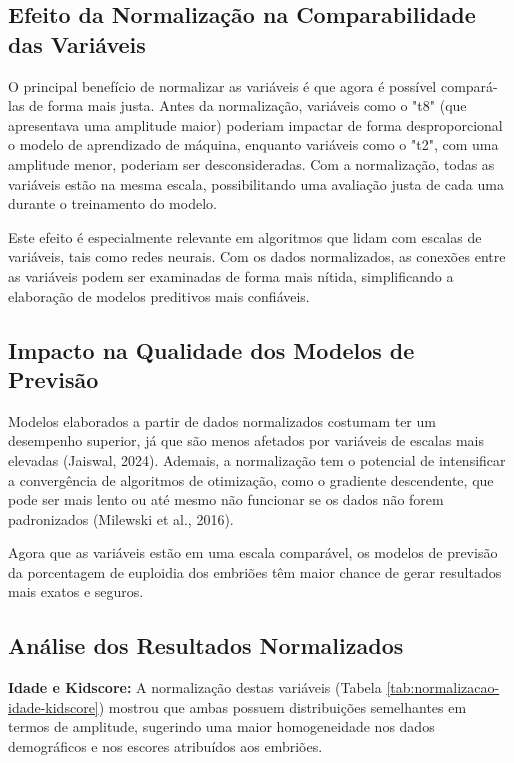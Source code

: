 \subsection*{Efeito da Normalização na Comparabilidade das Variáveis}
O principal benefício de normalizar as variáveis é que agora é possível compará-las de forma mais justa. Antes da normalização, variáveis como o "t8" (que apresentava uma amplitude maior) poderiam impactar de forma desproporcional o modelo de aprendizado de máquina, enquanto variáveis como o "t2", com uma amplitude menor, poderiam ser desconsideradas. Com a normalização, todas as variáveis estão na mesma escala, possibilitando uma avaliação justa de cada uma durante o treinamento do modelo.

Este efeito é especialmente relevante em algoritmos que lidam com escalas de variáveis, tais como redes neurais. Com os dados normalizados, as conexões entre as variáveis podem ser examinadas de forma mais nítida, simplificando a elaboração de modelos preditivos mais confiáveis.

\subsection*{Impacto na Qualidade dos Modelos de Previsão}
Modelos elaborados a partir de dados normalizados costumam ter um desempenho superior, já que são menos afetados por variáveis de escalas mais elevadas (Jaiswal, 2024). Ademais, a normalização tem o potencial de intensificar a convergência de algoritmos de otimização, como o gradiente descendente, que pode ser mais lento ou até mesmo não funcionar se os dados não forem padronizados (Milewski et al., 2016).

Agora que as variáveis estão em uma escala comparável, os modelos de previsão da porcentagem de euploidia dos embriões têm maior chance de gerar resultados mais exatos e seguros. 

\subsection*{Análise dos Resultados Normalizados}
\textbf{Idade e Kidscore:} A normalização destas variáveis (Tabela \ref{tab:normalizacao-idade-kidscore}) mostrou que ambas possuem distribuições semelhantes em termos de amplitude, sugerindo uma maior homogeneidade nos dados demográficos e nos escores atribuídos aos embriões.


